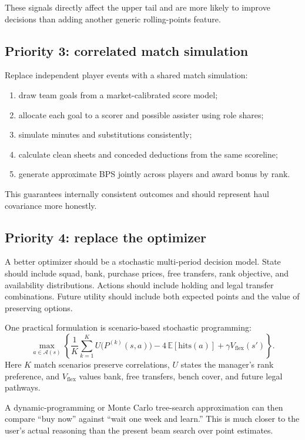 \documentclass[11pt,a4paper]{article}
\newcommand{\E}{\mathbb{E}}
\begin{document}
These signals directly affect the upper tail and are more likely to improve decisions than adding another generic rolling-points feature.

\subsection{Priority 3: correlated match simulation}

Replace independent player events with a shared match simulation:

\begin{enumerate}
  \item draw team goals from a market-calibrated score model;
  \item allocate each goal to a scorer and possible assister using role shares;
  \item simulate minutes and substitutions consistently;
  \item calculate clean sheets and conceded deductions from the same scoreline;
  \item generate approximate BPS jointly across players and award bonus by rank.
\end{enumerate}

This guarantees internally consistent outcomes and should represent haul covariance more honestly.

\subsection{Priority 4: replace the optimizer}

A better optimizer should be a stochastic multi-period decision model. State should include squad, bank, purchase prices, free transfers, rank objective, and availability distributions. Actions should include holding and legal transfer combinations. Future utility should include both expected points and the value of preserving options.

One practical formulation is scenario-based stochastic programming:
\begin{equation}
  \max_{a\in\mathcal{A}(s)}
  \left\{\frac{1}{K}\sum_{k=1}^{K}U\bigl(P^{(k)}(s,a)\bigr)
  -4\,\E[\text{hits}(a)]+\gamma V_{\text{flex}}(s')\right\}.
\end{equation}
Here $K$ match scenarios preserve correlations, $U$ states the manager's rank preference, and $V_{\text{flex}}$ values bank, free transfers, bench cover, and future legal pathways.

A dynamic-programming or Monte Carlo tree-search approximation can then compare ``buy now'' against ``wait one week and learn.'' This is much closer to the user's actual reasoning than the present beam search over point estimates.
\end{document}
